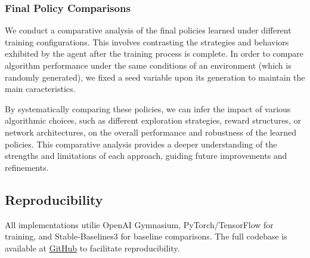 \documentclass[../CSC_52081_EP.tex]{subfiles}
\begin{document}
\subsubsection{Final Policy Comparisons}
We conduct a comparative analysis of the final policies learned under different training configurations. This involves contrasting the strategies and behaviors exhibited by the agent after the training process is complete. In order to compare algorithm performance under the same conditions of an environment (which is randomly generated), we fixed a seed variable upon its generation to maintain the main caracteristics.

By systematically comparing these policies, we can infer the impact of various algorithmic choices, such as different exploration strategies, reward structures, or network architectures, on the overall performance and robustness of the learned policies. This comparative analysis provides a deeper understanding of the strengths and limitations of each approach, guiding future improvements and refinements.


\subsection{Reproducibility}
All implementations utilie OpenAI Gymnasium, PyTorch/TensorFlow for training, and Stable-Baselines3 for baseline comparisons. The full codebase is available at \href{https://github.com/tr0fin0/ensta_CSC_52081_EP_project}{GitHub} to facilitate reproducibility.
\end{document}
